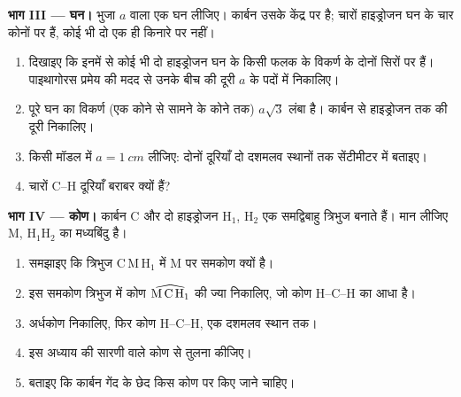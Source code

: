 \begin{problem}[{सप्ताहांत समस्या --- आण्विक मॉडल किट की कार्बन गेंदों की
रूपरेखा: छेद किस कोण पर किए जाएँ?}]
\medskip
\noindent\textbf{भाग III --- घन।}
भुजा $a$ वाला एक घन लीजिए। कार्बन  उसके केंद्र पर है; चारों
हाइड्रोजन  घन के चार कोनों पर हैं, कोई भी दो एक ही किनारे पर नहीं।
\begin{enumerate}[resume]
  \item दिखाइए कि इनमें से कोई भी दो हाइड्रोजन  घन के किसी फलक के
        विकर्ण के दोनों सिरों पर हैं। पाइथागोरस प्रमेय की मदद से उनके बीच की दूरी
        $a$ के पदों में निकालिए।
  \item पूरे घन का विकर्ण (एक कोने से सामने के कोने तक) $a\sqrt{3}$ लंबा है।
        कार्बन  से हाइड्रोजन  तक की दूरी
        निकालिए।
  \item किसी मॉडल में $a = \qty{1}{cm}$ लीजिए: दोनों दूरियाँ दो दशमलव स्थानों तक
        सेंटीमीटर में बताइए।
  \item चारों C--H दूरियाँ बराबर क्यों हैं?
\end{enumerate}

\medskip
\noindent\textbf{भाग IV --- कोण।}
कार्बन  C और दो हाइड्रोजन  H$_1$, H$_2$ एक समद्विबाहु
त्रिभुज बनाते हैं। मान लीजिए M, H$_1$H$_2$ का मध्यबिंदु है।
\begin{enumerate}[resume]
  \item समझाइए कि त्रिभुज C\,M\,H$_1$ में M पर समकोण क्यों है।
  \item इस समकोण त्रिभुज में कोण
        $\widehat{\text{M\,C\,H}_1}$ की ज्या निकालिए, जो कोण H--C--H का आधा है।
  \item अर्धकोण निकालिए, फिर कोण H--C--H, एक दशमलव
        स्थान तक।
  \item इस अध्याय की सारणी वाले कोण से तुलना कीजिए।
  \item बताइए कि कार्बन गेंद के छेद किस कोण पर किए
        जाने चाहिए।
\end{enumerate}
\end{problem}
